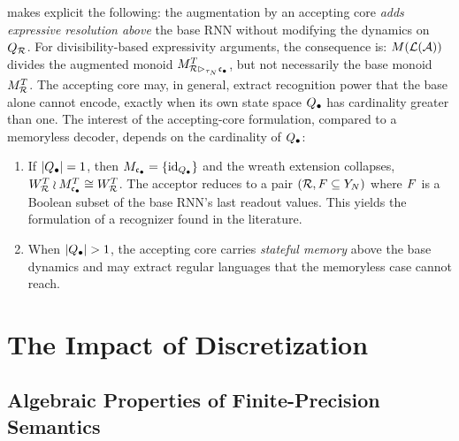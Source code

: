 \documentclass{article}
\begin{document}
\begin{remark}\label{rem:accepting-above} 
 makes explicit the following: the augmentation by an accepting core \emph{adds expressive resolution above} the base RNN without modifying the dynamics on $Q_{\mathcal{R}}$. 
For divisibility-based expressivity arguments, the consequence is: $M(\mathcal{L}(\mathcal{A}))$ divides the augmented monoid $M_{\mathcal{R} \mathbin{\rhd_{\tau_N}} {\mathfrak{c}_{\bullet}}}^T$, but not necessarily the base monoid $M_{\mathcal{R}}^T$. 
The accepting core may, in general, extract recognition power that the base alone cannot encode, exactly when its own state space $Q_\bullet$ has cardinality greater than one. 
The interest of the accepting-core formulation, compared to a memoryless decoder, depends on the cardinality of $Q_\bullet$:
\begin{enumerate}\itemsep 0em
\item[(i)] If $|Q_\bullet| = 1$, then $M_{\mathfrak{c}_{\bullet}} = \{\mathrm{id}_{Q_\bullet}\}$ and the wreath extension collapses, $W_{\mathcal{R}}^T \wr M_{\mathfrak{c}_{\bullet}}^T \cong W_{\mathcal{R}}^T$. 
The acceptor reduces to a pair $(\mathcal{R}, F \subseteq Y_N)$ where $F$ is a Boolean subset of the base RNN's last readout values. This yields the formulation of a recognizer found in the literature.
\item[(ii)] When $|Q_\bullet| > 1$, the accepting core carries \emph{stateful memory} above the base dynamics and may extract regular languages that the memoryless case cannot reach.
\end{enumerate}
\end{remark}























\section{The Impact of Discretization}\label{sec:discretization}
\subsection{Algebraic Properties of Finite-Precision Semantics}
\end{document}
